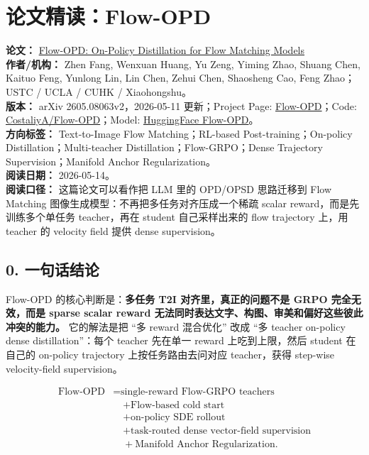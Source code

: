 
\section{论文精读：Flow-OPD}

\begin{conceptbox}
\textbf{论文：} \href{https://arxiv.org/abs/2605.08063}{Flow-OPD: On-Policy Distillation for Flow Matching Models}\\
\textbf{作者/机构：} Zhen Fang, Wenxuan Huang, Yu Zeng, Yiming Zhao, Shuang Chen, Kaituo Feng, Yunlong Lin, Lin Chen, Zehui Chen, Shaosheng Cao, Feng Zhao；USTC / UCLA / CUHK / Xiaohongshu。\\
\textbf{版本：} arXiv 2605.08063v2，2026-05-11 更新；Project Page: \href{https://costaliya.github.io/Flow-OPD/}{Flow-OPD}；Code: \href{https://github.com/CostaliyA/Flow-OPD}{CostaliyA/Flow-OPD}；Model: \href{https://huggingface.co/CostaliyA/Flow-OPD}{HuggingFace Flow-OPD}。\\
\textbf{方向标签：} Text-to-Image Flow Matching；RL-based Post-training；On-policy Distillation；Multi-teacher Distillation；Flow-GRPO；Dense Trajectory Supervision；Manifold Anchor Regularization。\\
\textbf{阅读日期：} 2026-05-14。\\
\textbf{阅读口径：} 这篇论文可以看作把 LLM 里的 OPD/OPSD 思路迁移到 Flow Matching 图像生成模型：不再把多任务对齐压成一个稀疏 scalar reward，而是先训练多个单任务 teacher，再在 student 自己采样出来的 flow trajectory 上，用 teacher 的 velocity field 提供 dense supervision。
\end{conceptbox}

\subsection{0. 一句话结论}

Flow-OPD 的核心判断是：\textbf{多任务 T2I 对齐里，真正的问题不是 GRPO 完全无效，而是 sparse scalar reward 无法同时表达文字、构图、审美和偏好这些彼此冲突的能力。} 它的解法是把 ``多 reward 混合优化'' 改成 ``多 teacher on-policy dense distillation''：每个 teacher 先在单一 reward 上吃到上限，然后 student 在自己的 on-policy trajectory 上按任务路由去问对应 teacher，获得 step-wise velocity-field supervision。

\[
\begin{aligned}
\text{Flow-OPD}
&= \text{single-reward Flow-GRPO teachers}\\
&\quad + \text{Flow-based cold start}\\
&\quad + \text{on-policy SDE rollout}\\
&\quad + \text{task-routed dense vector-field supervision}\\
&\quad + \text{Manifold Anchor Regularization}.
\end{aligned}
\]

